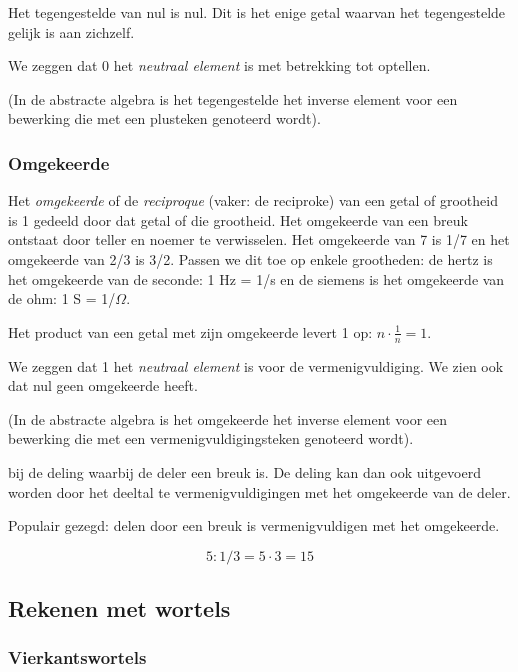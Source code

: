 Het tegengestelde van nul is nul. Dit is het enige getal
waarvan het tegengestelde gelijk is aan zichzelf. 

We zeggen dat 0 het \emph{neutraal element} is met betrekking
tot optellen.

(In de abstracte algebra is het tegengestelde het inverse
element voor een bewerking die met een plusteken genoteerd wordt).

\bigskip{}

\subsubsection{Omgekeerde}

Het \emph{omgekeerde} of de \emph{reciproque} (vaker: de
reciproke) van een getal of grootheid is 1 gedeeld door dat getal
of die grootheid. Het omgekeerde van een breuk ontstaat door teller
en noemer te verwisselen. Het omgekeerde van 7 is 1/7 en het omgekeerde
van 2/3 is 3/2. Passen we dit toe op enkele grootheden: de hertz is
het omgekeerde van de seconde: 1 Hz = 1/s en de siemens is het omgekeerde
van de ohm: 1 S = 1/$\Omega$.

Het product van een getal met zijn omgekeerde levert 1 op:
${\displaystyle n\cdot \frac{1}{n}=1}$. 

We zeggen dat 1 het \emph{neutraal element} is voor de vermenigvuldiging.
We zien ook dat nul geen omgekeerde heeft.

(In de abstracte algebra is het omgekeerde het inverse element
voor een bewerking die met een vermenigvuldigingsteken genoteerd wordt).

bij de deling waarbij de deler een breuk is. De deling kan dan ook
uitgevoerd worden door het deeltal te vermenigvuldigingen met het
omgekeerde van de deler. 

Populair gezegd: delen door een breuk is vermenigvuldigen
met het omgekeerde.

\begin{voorbeeld}
\begin{equation*}
5:1/3=5\cdot3=15
\end{equation*} 
\end{voorbeeld}

\subsection{Rekenen met wortels}
\subsubsection{Vierkantswortels}

